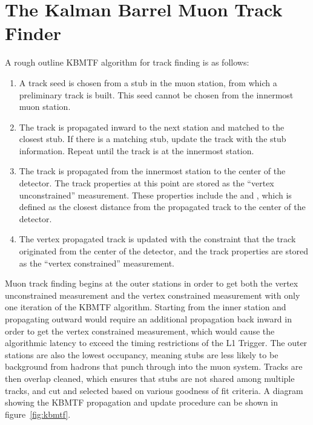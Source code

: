 \section{The Kalman Barrel Muon Track Finder} \label{sec:kbmtf}
A rough outline KBMTF algorithm for track finding is as follows:
\begin{enumerate}
	\item A track seed is chosen from a stub in the muon station, from which a preliminary track is built. This seed cannot be chosen from the innermost muon station.
	\item The track is propagated inward to the next station and matched to the closest stub. If there is a matching stub, update the track with the stub information. Repeat until the track is at the innermost station. \label{kbmtf_step2}
	\item The track is propagated from the innermost station to the center of the detector. The track properties at this point are stored as the ``vertex unconstrained'' measurement. These properties include the \pt and \dxy, which is defined as the closest distance from the propagated track to the center of the detector. \label{kbmtf_step3}
	\item The vertex propagated track is updated with the constraint that the track originated from the center of the detector, and the track properties are stored as the ``vertex constrained'' measurement. \label{kbmtf_step4}
\end{enumerate}

Muon track finding begins at the outer stations in order to get both the vertex unconstrained measurement and the vertex constrained measurement with only one iteration of the KBMTF algorithm. Starting from the inner station and propagating outward would require an additional propagation back inward in order to get the vertex constrained measurement, which would cause the algorithmic latency to exceed the timing restrictions of the L1 Trigger. The outer stations are also the lowest occupancy, meaning stubs are less likely to be background from hadrons that punch through into the muon system. Tracks are then overlap cleaned, which ensures that stubs are not shared among multiple tracks, and cut and selected based on various goodness of fit criteria. A diagram showing the KBMTF propagation and update procedure can be shown in figure~\ref{fig:kbmtf}.

